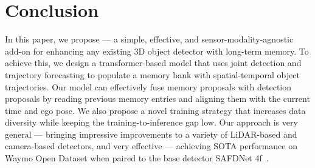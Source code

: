 \section{Conclusion}
\label{sec:conclusion}

In this paper, we propose \ourmodel{} --- a simple, effective, and sensor-modality-agnostic add-on for enhancing any existing
3D object detector with long-term memory.
To achieve this, we
design a transformer-based model
that uses joint detection and trajectory forecasting to populate a memory bank with spatial-temporal object trajectories.
Our model can effectively fuse memory proposals with detection proposals by reading previous memory entries and aligning them with the current time and ego pose.
We also propose a novel training strategy that increases data diversity while keeping the training-to-inference gap low.
Our approach is very general --- bringing impressive improvements to a variety of LiDAR-based and camera-based detectors, and very effective --- achieving SOTA performance on Waymo Open Dataset when paired to the base detector SAFDNet 4f~\cite{safdnet}.